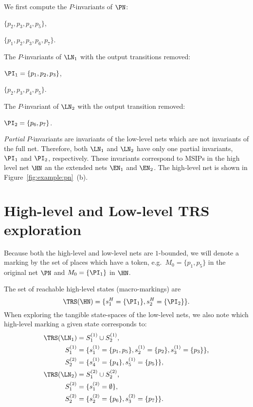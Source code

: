 We first compute the $P$-invariants of $\PN$:
\begin{itemize*}
\item $\{p_2, p_3, p_4, p_5\}$,
\item $\{p_1, p_2, p_3, p_6, p_7\}$.
\end{itemize*}
The $P$-invariants of $\LN_1$ with the output transitions removed:
\begin{itemize*}
\item $\PI_1 = \{p_1, p_2, p_3\}$,
\item $\{p_2, p_3, p_4, p_5\}$.
\end{itemize*}
The $P$-invariant of $\LN_2$ with the output transition removed:
\begin{itemize*}
\item $\PI_2 = \{p_6, p_7\}$.
\end{itemize*}

\emph{Partial} $P$-invariants are invariants of the low-level nets
which are not invariants of the full net. Therefore, both $\LN_1$ and
$\LN_2$ have only one partial invariants, $\PI_1$ and $\PI_2$,
respectively. These invariants correspond to MSIPs in the high level
net $\HN$ an the extended nets $\EN_1$ and $\EN_2$. The high-level net
is shown in Figure~\ref{fig:example:pn}~(b).

\section{High-level and Low-level TRS exploration}

Because both the high-level and low-level nets are $1$-bounded, we
will denote a marking by the set of places which have a token,
e.g.~$M_0 = \{p_1, p_5\}$ in the original net $\PN$ and $M_0 =
\{\PI_1\}$ in $\HN$.

The set of reachable high-level states (macro-markings) are
\begin{equation*}
  \TRS(\HN) = \{s^H_1 = \{\PI_1\}, s^H_2 = \{\PI_2\}\} \text.
\end{equation*}
When exploring the tangible state-spaces of the low-level nets, we
also note which high-level marking a given state corresponds to:
\begin{align*}
  \TRS(\LN_1) &= S^{(1)}_1 \cup S^{(1)}_2 \text, \\
  S^{(1)}_1 &= \{s^{(1)}_{1} = \{p_1, p_5\}, s^{(1)}_{2} = \{p_2\},
              s^{(1)}_{3} = \{p_3\}\} \text, \\
  S^{(2)}_2 &= \{s^{(1)}_{4} = \{p_4\}, s^{(1)}_{5} = \{p_5\}\} \text,
  \\
  \TRS(\LN_2) &= S^{(2)}_1 \cup S^{(2)}_2 \text, \\
  S^{(2)}_1 &= \{s^{(2)}_{1} = \emptyset\} \text, \\
  S^{(2)}_2 &= \{s^{(2)}_{2} = \{p_6\}, s^{(2)}_{3} = \{p_7\}\} \text.
\end{align*}

